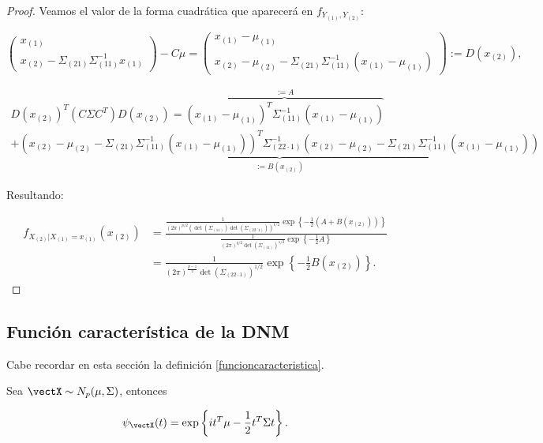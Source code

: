 \begin{proof}
  Veamos el valor de la forma cuadrática que aparecerá en $f_{Y_{(1)}, Y_{(2)}}$:

  \[
     \left(
     \begin{array}{c}
       x_{(1)} \\ \hline
       x_{(2)} - \Sigma_{(21)}\Sigma_{(11)}^{-1}x_{(1)}
     \end{array}
     \right) - C\mu = \left(
     \begin{array}{c}
       x_{(1)} - \mu_{(1)} \\ \hline
       x_{(2)} - \mu_{(2)} - \Sigma_{(21)}\Sigma_{(11)}^{-1}(x_{(1)} - \mu_{(1)})
     \end{array}
     \right) := D(x_{(2)}),
   \]

   \[
   \begin{split}
     D(x_{(2)})^T (C\Sigma C^T) D(x_{(2)}) = \overbrace{(x_{(1)} - \mu_{(1)})^T \Sigma_{(11)}^{-1} (x_{(1)} - \mu_{(1)})}^{:= A} \\
     + \underbrace{(x_{(2)} - \mu_{(2)} - \Sigma_{(21)}\Sigma_{(11)}^{-1}(x_{(1)} - \mu_{(1)}))^T \Sigma_{(22\cdot 1)}^{-1}
       (x_{(2)} - \mu_{(2)} - \Sigma_{(21)}\Sigma_{(11)}^{-1}(x_{(1)} - \mu_{(1)}))}_{:= B(x_{(2)})}
   \end{split}
   \]  

   Resultando:

   \[
   \begin{split}
     f_{X_{(2)} | X_{(1)} = x_{(1)}}(x_{(2)}) & = \frac{ \frac{1}{(2\pi)^{p/2} (\det(\Sigma_{(11)})\det(\Sigma_{(22\cdot 1)}))^{1/2}} \exp\left\{ -\frac{1}{2} (A + B(x_{(2)}))  \right\} }
     { \frac{1}{(2\pi)^{q/2} \det(\Sigma_{(11)})^{1/2}} \exp\left\{ -\frac{1}{2} A \right\} } \\
     & = \frac{1}{(2\pi)^{\frac{p-1}{2}} \det(\Sigma_{(22\cdot 1)})^{1/2}} \exp\left\{ -\frac{1}{2} B(x_{(2)}) \right\}.
   \end{split}
   \]
  \end{proof}



  \subsection{Función característica de la DNM}

  Cabe recordar en esta sección la definición \ref{funcioncaracteristica}.

  \begin{nprop}
    Sea $\vectX \sim N_p(\mu, \Sigma)$, entonces
    
    \[
      \psi_{\vectX}(t) = \exp\left\{ it^T\mu - \frac{1}{2} t^T \Sigma t \right\}
    .\]
  \end{nprop}

